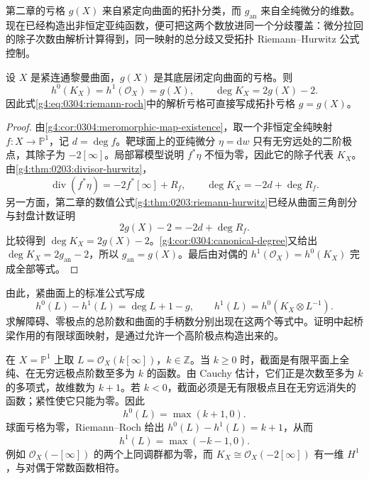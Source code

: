 第二章的亏格 \(g(X)\) 来自紧定向曲面的拓扑分类，而 \(g_{\mathrm{an}}\) 来自全纯微分的维数。现在已经构造出非恒定亚纯函数，便可把这两个数放进同一个分歧覆盖：微分拉回的除子次数由解析计算得到，同一映射的总分歧又受拓扑 Riemann--Hurwitz 公式控制。

\begin{theorem}
	\label{g4:thm:0304:genus-comparison}
	设 \(X\) 是紧连通黎曼曲面，\(g(X)\) 是其底层闭定向曲面的亏格。则
	\[
		h^0(K_X)=h^1(\mathcal O_X)=g(X),
		\qquad \deg K_X=2g(X)-2.
	\]
	因此式\eqref{g4:eq:0304:riemann-roch}中的解析亏格可直接写成拓扑亏格 \(g=g(X)\)。
\end{theorem}
\begin{proof}
	由\cref{g4:cor:0304:meromorphic-map-existence}，取一个非恒定全纯映射 \(f:X\to\mathbb P^1\)，记 \(d=\deg f\)。靶球面上的亚纯微分 \(\eta=\mathrm{d}w\) 只有无穷远处的二阶极点，其除子为 \(-2[\infty]\)。局部幂模型说明 \(f^*\eta\) 不恒为零，因此它的除子代表 \(K_X\)。由\cref{g4:thm:0203:divisor-hurwitz}，
	\[
		\operatorname{div}(f^*\eta)=-2f^*[\infty]+R_f,
		\qquad \deg K_X=-2d+\deg R_f.
	\]
	另一方面，第二章的数值公式\cref{g4:thm:0203:riemann-hurwitz}已经从曲面三角剖分与封盘计数证明
	\[
		2g(X)-2=-2d+\deg R_f.
	\]
	比较得到 \(\deg K_X=2g(X)-2\)。\cref{g4:cor:0304:canonical-degree}又给出 \(\deg K_X=2g_{\mathrm{an}}-2\)，所以 \(g_{\mathrm{an}}=g(X)\)。最后由对偶的 \(h^1(\mathcal O_X)=h^0(K_X)\) 完成全部等式。
\end{proof}

由此，紧曲面上的标准公式写成
\[
	h^0(L)-h^1(L)=\deg L+1-g,
	\qquad h^1(L)=h^0(K_X\otimes L^{-1}).
\]
求解障碍、零极点的总阶数和曲面的手柄数分别出现在这两个等式中。证明中起桥梁作用的有限球面映射，是通过允许一个高阶极点构造出来的。

\begin{example}
	\label{g4:exm:0304:sphere-cohomology}
	在 \(X=\mathbb P^1\) 上取 \(L=\mathcal O_X(k[\infty])\)，\(k\in\mathbb Z\)。当 \(k\ge0\) 时，截面是有限平面上全纯、在无穷远极点阶数至多为 \(k\) 的函数。由 Cauchy 估计，它们正是次数至多为 \(k\) 的多项式，故维数为 \(k+1\)。若 \(k<0\)，截面必须是无有限极点且在无穷远消失的函数；紧性使它只能为零。因此
	\[
		h^0(L)=\max(k+1,0).
	\]
	球面亏格为零，Riemann--Roch 给出 \(h^0(L)-h^1(L)=k+1\)，从而
	\[
		h^1(L)=\max(-k-1,0).
	\]
	例如 \(\mathcal O_X(-[\infty])\) 的两个上同调群都为零，而 \(K_X\cong\mathcal O_X(-2[\infty])\) 有一维 \(H^1\)，与对偶于常数函数相符。
\end{example}
